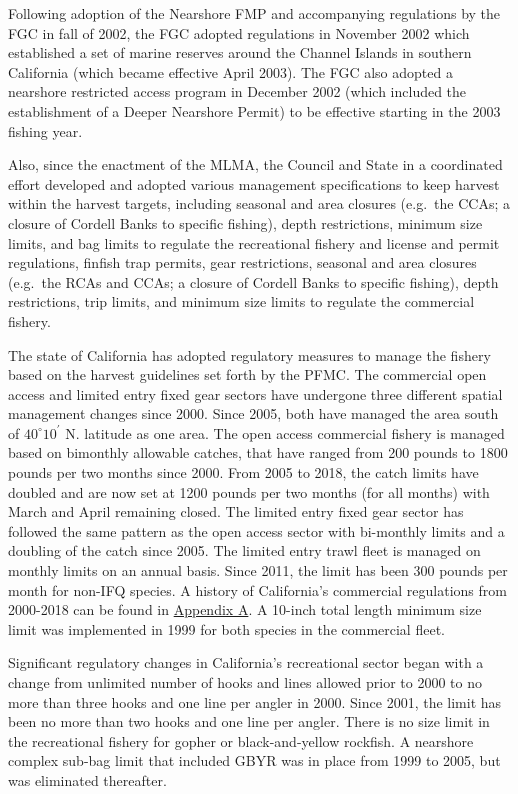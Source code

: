 \documentclass[12pt,]{article}
\begin{document}
Following adoption of the Nearshore FMP and accompanying regulations by
the FGC in fall of 2002, the FGC adopted regulations in November 2002
which established a set of marine reserves around the Channel Islands in
southern California (which became effective April 2003). The FGC also
adopted a nearshore restricted access program in December 2002 (which
included the establishment of a Deeper Nearshore Permit) to be effective
starting in the 2003 fishing year.

Also, since the enactment of the MLMA, the Council and State in a
coordinated effort developed and adopted various management
specifications to keep harvest within the harvest targets, including
seasonal and area closures (e.g.~the CCAs; a closure of Cordell Banks to
specific fishing), depth restrictions, minimum size limits, and bag
limits to regulate the recreational fishery and license and permit
regulations, finfish trap permits, gear restrictions, seasonal and area
closures (e.g.~the RCAs and CCAs; a closure of Cordell Banks to specific
fishing), depth restrictions, trip limits, and minimum size limits to
regulate the commercial fishery.

The state of California has adopted regulatory measures to manage the
fishery based on the harvest guidelines set forth by the PFMC. The
commercial open access and limited entry fixed gear sectors have
undergone three different spatial management changes since 2000. Since
2005, both have managed the area south of \(40^\circ 10^\prime\) N.
latitude as one area. The open access commercial fishery is managed
based on bimonthly allowable catches, that have ranged from 200 pounds
to 1800 pounds per two months since 2000. From 2005 to 2018, the catch
limits have doubled and are now set at 1200 pounds per two months (for
all months) with March and April remaining closed. The limited entry
fixed gear sector has followed the same pattern as the open access
sector with bi-monthly limits and a doubling of the catch since 2005.
The limited entry trawl fleet is managed on monthly limits on an annual
basis. Since 2011, the limit has been 300 pounds per month for non-IFQ
species. A history of California's commercial regulations from 2000-2018
can be found in
\protect\hyperlink{appendix-a.-californias-commercial-fishery-regulations}{Appendix
A}. A 10-inch total length minimum size limit was implemented in 1999
for both species in the commercial fleet.

Significant regulatory changes in California's recreational sector began
with a change from unlimited number of hooks and lines allowed prior to
2000 to no more than three hooks and one line per angler in 2000. Since
2001, the limit has been no more than two hooks and one line per angler.
There is no size limit in the recreational fishery for gopher or
black-and-yellow rockfish. A nearshore complex sub-bag limit that
included GBYR was in place from 1999 to 2005, but was eliminated
thereafter.
\end{document}
